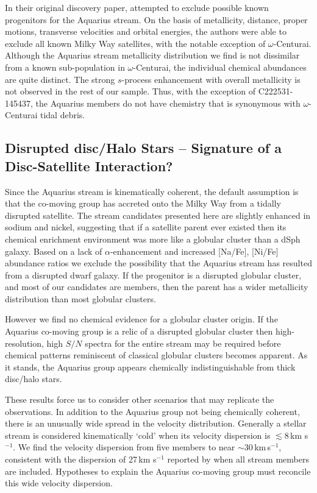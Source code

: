 \documentclass{emulateapj}
\begin{document}
In their original discovery paper, \citet{williams;et-al_2011} attempted to exclude possible known progenitors for the Aquarius stream. On the basis of metallicity, distance, proper motions, transverse velocities and orbital energies, the authors were able to exclude all known Milky Way satellites, with the notable exception of $\omega$-Centurai. Although the Aquarius stream metallicity distribution we find is not dissimilar from a known sub-population in $\omega$-Centurai, the individual chemical abundances are quite distinct. The strong $s$-process enhancement with overall metallicity is not observed in the rest of our sample. Thus, with the exception of {C222531-145437}, the Aquarius members do not have chemistry that is synonymous with $\omega$-Centurai tidal debris.

\subsection{Disrupted disc/Halo Stars -- Signature of a Disc-Satellite Interaction?}
Since the Aquarius stream is kinematically coherent, the default assumption is that the co-moving group has accreted onto the Milky Way from a tidally disrupted satellite. The stream candidates presented here are slightly enhanced in sodium and nickel, suggesting that if a satellite parent ever existed then its chemical enrichment environment was more like a globular cluster than a dSph galaxy. Based on a lack of $\alpha$-enhancement and increased [Na/Fe], [Ni/Fe] abundance ratios we exclude the possibility that the Aquarius stream has resulted from a disrupted dwarf galaxy. If the progenitor is a disrupted globular cluster, and most of our candidates are members, then the parent has a wider metallicity distribution than most globular clusters. 

However we find no chemical evidence for a globular cluster origin. If the Aquarius co-moving group is a relic of a disrupted globular cluster then high-resolution, high $S/N$ spectra for the entire stream may be required before chemical patterns reminiscent of classical globular clusters becomes apparent. As it stands, the Aquarius group appears chemically indistinguishable from thick disc/halo stars.

These results force us to consider other scenarios that may replicate the observations. In addition to the Aquarius group not being chemically coherent, there is an unusually wide spread in the velocity distribution. Generally a stellar stream is considered kinematically `cold' when its velocity dispersion is $\lesssim 8$\,km s$^{-1}$. We find the velocity dispersion from five members to near $\sim$30\,km\,s$^{-1}$, consistent with the dispersion of 27\,km s$^{-1}$ reported by \citet{williams;et-al_2011} when all stream members are included. Hypotheses to explain the Aquarius co-moving group must reconcile this wide velocity dispersion.
\end{document}
